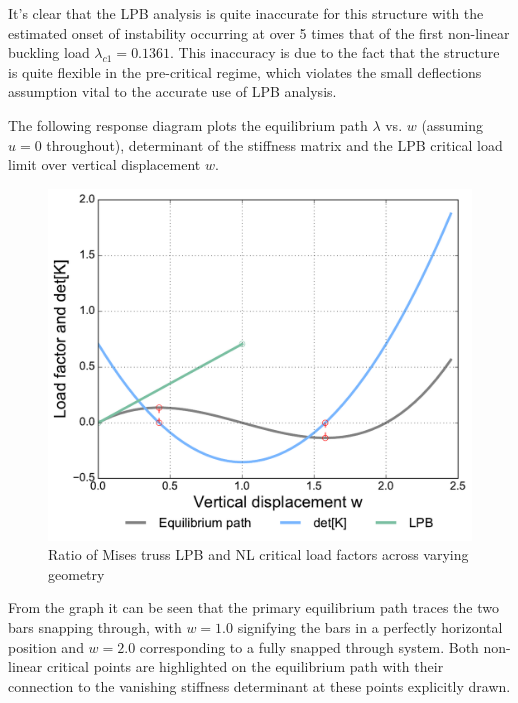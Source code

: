 It's clear that the LPB analysis is quite inaccurate for this structure with the estimated onset of instability occurring at over 5 times that of the first non-linear buckling load $\lambda_{c1} = 0.1361$. This inaccuracy is due to the fact that the structure is quite flexible in the pre-critical regime, which violates the small deflections assumption vital to the accurate use of LPB analysis.

The following response diagram plots the equilibrium path $\lambda$ vs. $w$ (assuming $u = 0$ throughout), determinant of the stiffness matrix and the LPB critical load limit over vertical displacement $w$.

\begin{figure}[H]
	\centering
	\def\svgwidth{\columnwidth}
	\includegraphics[width=12cm]{images/stability_analysis_mises_truss_1x1.pdf}
	\caption{Ratio of Mises truss LPB and NL critical load factors across varying geometry}
	\label{stab2}
\end{figure}

From the graph it can be seen that the primary equilibrium path traces the two bars snapping through, with $w=1.0$ signifying the bars in a perfectly horizontal position and $w=2.0$ corresponding to a fully snapped through system. Both non-linear critical points are highlighted on the equilibrium path with their connection to the vanishing stiffness determinant at these points explicitly drawn.

